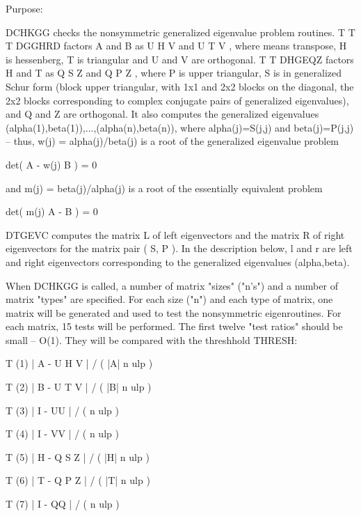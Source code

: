 \begin{DoxyParagraph}{Purpose\+: }
\begin{DoxyVerb} DCHKGG  checks the nonsymmetric generalized eigenvalue problem
 routines.
                                T          T        T
 DGGHRD factors A and B as U H V  and U T V , where   means
 transpose, H is hessenberg, T is triangular and U and V are
 orthogonal.
                                 T          T
 DHGEQZ factors H and T as  Q S Z  and Q P Z , where P is upper
 triangular, S is in generalized Schur form (block upper triangular,
 with 1x1 and 2x2 blocks on the diagonal, the 2x2 blocks
 corresponding to complex conjugate pairs of generalized
 eigenvalues), and Q and Z are orthogonal.  It also computes the
 generalized eigenvalues (alpha(1),beta(1)),...,(alpha(n),beta(n)),
 where alpha(j)=S(j,j) and beta(j)=P(j,j) -- thus,
 w(j) = alpha(j)/beta(j) is a root of the generalized eigenvalue
 problem

     det( A - w(j) B ) = 0

 and m(j) = beta(j)/alpha(j) is a root of the essentially equivalent
 problem

     det( m(j) A - B ) = 0

 DTGEVC computes the matrix L of left eigenvectors and the matrix R
 of right eigenvectors for the matrix pair ( S, P ).  In the
 description below,  l and r are left and right eigenvectors
 corresponding to the generalized eigenvalues (alpha,beta).

 When DCHKGG is called, a number of matrix "sizes" ("n's") and a
 number of matrix "types" are specified.  For each size ("n")
 and each type of matrix, one matrix will be generated and used
 to test the nonsymmetric eigenroutines.  For each matrix, 15
 tests will be performed.  The first twelve "test ratios" should be
 small -- O(1).  They will be compared with the threshhold THRESH:

                  T
 (1)   | A - U H V  | / ( |A| n ulp )

                  T
 (2)   | B - U T V  | / ( |B| n ulp )

               T
 (3)   | I - UU  | / ( n ulp )

               T
 (4)   | I - VV  | / ( n ulp )

                  T
 (5)   | H - Q S Z  | / ( |H| n ulp )

                  T
 (6)   | T - Q P Z  | / ( |T| n ulp )

               T
 (7)   | I - QQ  | / ( n ulp )


\end{DoxyVerb}
\end{DoxyParagraph}
